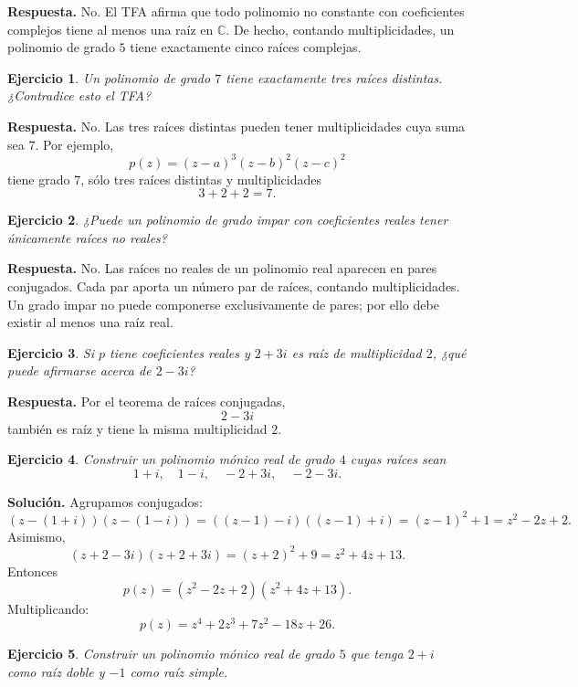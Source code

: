 \documentclass[12pt]{article}
\newtheorem{ejercicio}{Ejercicio}[section]
\newcommand{\C}{\mathbb{C}}
\begin{document}
\textbf{Respuesta.}
No. El TFA afirma que todo polinomio no constante con coeficientes complejos
tiene al menos una raíz en $\C$. De hecho, contando multiplicidades, un
polinomio de grado $5$ tiene exactamente cinco raíces complejas.

\begin{ejercicio}
Un polinomio de grado $7$ tiene exactamente tres raíces distintas. ¿Contradice
esto el TFA?
\end{ejercicio}

\textbf{Respuesta.}
No. Las tres raíces distintas pueden tener multiplicidades cuya suma sea $7$.
Por ejemplo,
\[
p(z)=(z-a)^3(z-b)^2(z-c)^2
\]
tiene grado $7$, sólo tres raíces distintas y multiplicidades
\[
3+2+2=7.
\]

\begin{ejercicio}
¿Puede un polinomio de grado impar con coeficientes reales tener únicamente
raíces no reales?
\end{ejercicio}

\textbf{Respuesta.}
No. Las raíces no reales de un polinomio real aparecen en pares conjugados.
Cada par aporta un número par de raíces, contando multiplicidades. Un grado
impar no puede componerse exclusivamente de pares; por ello debe existir al
menos una raíz real.

\begin{ejercicio}
Si $p$ tiene coeficientes reales y $2+3i$ es raíz de multiplicidad $2$, ¿qué
puede afirmarse acerca de $2-3i$?
\end{ejercicio}

\textbf{Respuesta.}
Por el teorema de raíces conjugadas,
\[
\boxed{2-3i}
\]
también es raíz y tiene la misma multiplicidad $2$.

\begin{ejercicio}
Construir un polinomio mónico real de grado $4$ cuyas raíces sean
\[
1+i,\quad1-i,\quad-2+3i,\quad-2-3i.
\]
\end{ejercicio}

\textbf{Solución.}
Agrupamos conjugados:
\[
(z-(1+i))(z-(1-i))
=((z-1)-i)((z-1)+i)
=(z-1)^2+1
=z^2-2z+2.
\]
Asimismo,
\[
(z+2-3i)(z+2+3i)
=(z+2)^2+9
=z^2+4z+13.
\]
Entonces
\[
p(z)=(z^2-2z+2)(z^2+4z+13).
\]
Multiplicando:
\[
\boxed{
p(z)=z^4+2z^3+7z^2-18z+26.
}
\]

\begin{ejercicio}
Construir un polinomio mónico real de grado $5$ que tenga $2+i$ como raíz
doble y $-1$ como raíz simple.
\end{ejercicio}
\end{document}
